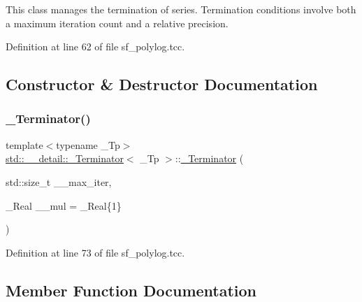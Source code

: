 This class manages the termination of series. Termination conditions involve both a maximum iteration count and a relative precision. 

Definition at line 62 of file sf\+\_\+polylog.\+tcc.



\subsection{Constructor \& Destructor Documentation}
\mbox{\label{classstd_1_1____detail_1_1__Terminator_aee41e518162f472b6e62a5477f3256d4}} 
\subsubsection{\texorpdfstring{\+\_\+\+Terminator()}{\_Terminator()}}
{\footnotesize\ttfamily template$<$typename \+\_\+\+Tp$>$ \\
\hyperlink{classstd_1_1____detail_1_1__Terminator}{std\+::\+\_\+\+\_\+detail\+::\+\_\+\+Terminator}$<$ \+\_\+\+Tp $>$\+::\hyperlink{classstd_1_1____detail_1_1__Terminator}{\+\_\+\+Terminator} (\begin{DoxyParamCaption}\item[{std\+::size\+\_\+t}]{\+\_\+\+\_\+max\+\_\+iter,  }\item[{\+\_\+\+Real}]{\+\_\+\+\_\+mul = {\ttfamily \+\_\+Real\{1\}} }\end{DoxyParamCaption})\hspace{0.3cm}{\ttfamily [inline]}}



Definition at line 73 of file sf\+\_\+polylog.\+tcc.



\subsection{Member Function Documentation}
\mbox{\label{classstd_1_1____detail_1_1__Terminator_a8797a4fa304ad360f9b101bd340d614d}} 
